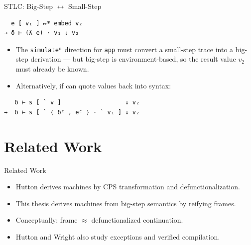 \documentclass[10pt,compress,aspectratio=169]{beamer}
\begin{document}
\begin{frame}[fragile]{STLC: Big-Step $\leftrightarrow$ Small-Step}
\begin{verbatim}
  e [ v₁ ] ↦* embed v₂ 
→ δ ⊢ (ƛ e) · v₁ ⇓ v₂
\end{verbatim}
\begin{itemize}
    \item The \texttt{simulateᴿ} direction for \texttt{app} must convert a small-step trace into a big-step derivation --- but big-step is environment-based, so the result value $v_2$ must already be known.
    \item Alternatively, if can quote values back into syntax:
\end{itemize}

\begin{verbatim}
   δ ⊢ s [ ` v ]                  ⇓ v₂  
→  δ ⊢ s [ ` ⟨ δᶜ , eᶜ ⟩ · ` v₁ ] ⇓ v₂
\end{verbatim}

\end{frame}

\section{Related Work}
\begin{frame}{Related Work}
\begin{itemize}
    \item Hutton derives machines by CPS transformation and defunctionalization.
    \item This thesis derives machines from big-step semantics by reifying frames.
    \item Conceptually: frame $\approx$ defunctionalized continuation.
    \item Hutton and Wright also study exceptions and verified compilation.
\end{itemize}
\end{frame}
\end{document}
